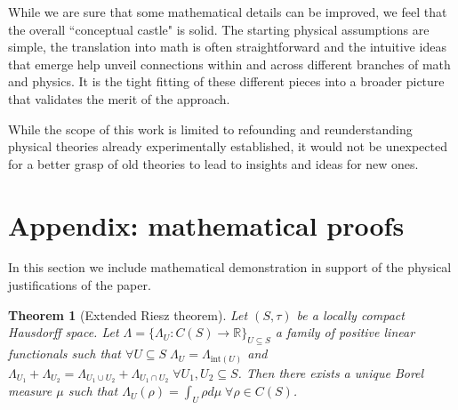 \documentclass[smallextended]{svjour3}
\numberwithin{equation}{section}
\newtheorem{thrm}[equation]{Theorem}
\theoremstyle{definition}
\begin{document}
While we are sure that some mathematical details can be improved, we feel that the overall ``conceptual castle" is solid. The starting physical assumptions are simple, the translation into math is often straightforward and the intuitive ideas that emerge help unveil connections within and across different branches of math and physics. It is the tight fitting of these different pieces into a broader picture that validates the merit of the approach.

While the scope of this work is limited to refounding and reunderstanding physical theories already experimentally established, it would not be unexpected for a better grasp of old theories to lead to insights and ideas for new ones.



\section{Appendix: mathematical proofs}

In this section we include mathematical demonstration in support of the physical justifications of the paper.

\begin{thrm}[Extended Riesz theorem]\label{extended_riesz_theorem}
	Let $(S, \tau)$ be a locally compact Hausdorff space. Let $\Lambda = \{\Lambda_U : C(S) \rightarrow \mathbb{R}\}_{U \subseteq S}$ a family of positive linear functionals such that $\forall U \subseteq S \; \Lambda_U = \Lambda_{\mathrm{int}(U)}$ and $\Lambda_{U_1} + \Lambda_{U_2} = \Lambda_{U_1 \cup U_2} + \Lambda_{U_1 \cap U_2} \; \forall U_1, U_2 \subseteq S$. Then there exists a unique Borel measure $\mu$ such that $\Lambda_U (\rho) = \int_{U} \rho d\mu \; \forall \rho \in C(S)$.
\end{thrm}
\end{document}
